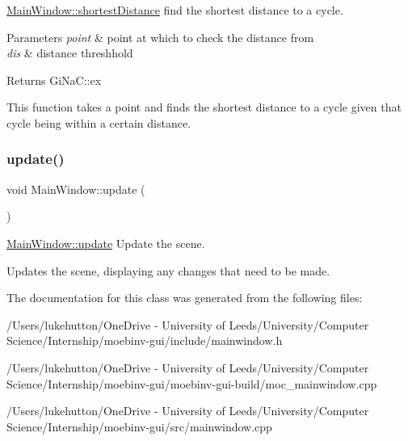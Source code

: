 \mbox{\hyperlink{class_main_window_a2431b3144405d8d0d3e8bd3523ad381b}{Main\+Window\+::shortest\+Distance}} find the shortest distance to a cycle. 


\begin{DoxyParams}{Parameters}
{\em point} & point at which to check the distance from \\
\hline
{\em dis} & distance threshhold \\
\hline
\end{DoxyParams}
\begin{DoxyReturn}{Returns}
Gi\+Na\+C\+::ex
\end{DoxyReturn}
This function takes a point and finds the shortest distance to a cycle given that cycle being within a certain distance. \mbox{\label{class_main_window_a128f71880d4b9683149023fc46fcc9f8}} 
\subsubsection{\texorpdfstring{update()}{update()}}
{\footnotesize\ttfamily void Main\+Window\+::update (\begin{DoxyParamCaption}{ }\end{DoxyParamCaption})}



\mbox{\hyperlink{class_main_window_a128f71880d4b9683149023fc46fcc9f8}{Main\+Window\+::update}} Update the scene. 

Updates the scene, displaying any changes that need to be made. 

The documentation for this class was generated from the following files\+:\begin{DoxyCompactItemize}
\item 
/\+Users/lukehutton/\+One\+Drive -\/ University of Leeds/\+University/\+Computer Science/\+Internship/moebinv-\/gui/include/mainwindow.\+h\item 
/\+Users/lukehutton/\+One\+Drive -\/ University of Leeds/\+University/\+Computer Science/\+Internship/moebinv-\/gui/moebinv-\/gui-\/build/moc\+\_\+mainwindow.\+cpp\item 
/\+Users/lukehutton/\+One\+Drive -\/ University of Leeds/\+University/\+Computer Science/\+Internship/moebinv-\/gui/src/mainwindow.\+cpp\end{DoxyCompactItemize}
